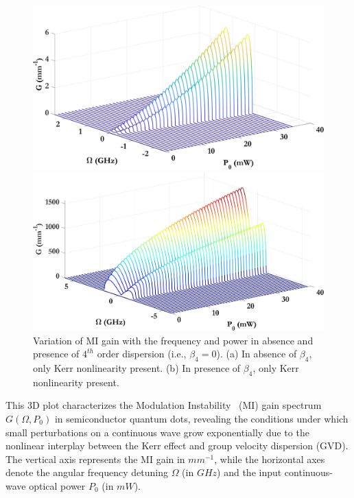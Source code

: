 \documentclass[12pt,a4paper]{article}
\begin{document}
\begin{figure}[h]
  \centering
  \begin{minipage}{0.48\textwidth}
    \centering
    \includegraphics[width=\linewidth]{Plots/Beta2_Kerr.jpeg}
    \subcaption{}
  \end{minipage}%
  \hfill
  \begin{minipage}{0.48\textwidth}
    \centering
    \includegraphics[width=\linewidth]{Plots/Beta4_Kerr.jpeg}
    \subcaption{}
  \end{minipage}
  \caption{Variation of MI gain with the frequency and power in absence and presence of $4^{th}$ order dispersion (i.e., $\beta_4=0$). (a) In absence of $\beta_4$, only Kerr nonlinearity present. (b) In presence of $\beta_4$, only Kerr nonlinearity present.}
  \label{fig:waterfall}
 \end{figure}
This 3D plot characterizes the Modulation Instability~\cite{lighthall} (MI) gain spectrum \( G(\Omega, P_0) \) in semiconductor quantum dots, revealing the conditions under which small perturbations on a continuous wave grow exponentially due to the nonlinear interplay between the Kerr effect and group velocity dispersion (GVD). The vertical axis represents the MI gain in ${mm^{-1}}$, while the horizontal axes denote the angular frequency detuning \( \Omega \) (in ${GHz}$) and the input continuous-wave optical power \( P_0 \) (in ${mW}$).
\end{document}
